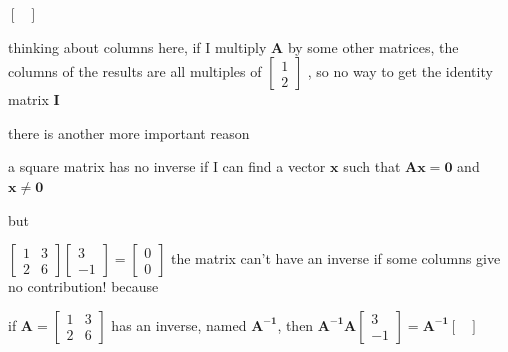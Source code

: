 \documentclass[12pt, a4paper]{article}
\begin{document}
{\begin{math}
\begin{bmatrix}
	\end{bmatrix}
\end{math}
\par thinking about columns here, if I multiply ${\mathbf{A}}$ by some other matrices, the columns of the results are all multiples of 
\begin{math}
	\begin{bmatrix}
		1 \\
		2
	\end{bmatrix}
\end{math}
, so no way to get the identity matrix ${\mathbf{I}}$
\par there is another more important reason
\par a square matrix has no inverse if I can find a vector ${\mathbf{x}}$ such that ${\mathbf{A}}{\mathbf{x}} = {\mathbf{0}}$ and ${\mathbf{x}} \neq {\mathbf{0}}$
\par but 
\par \qquad
\begin{math}
	\begin{bmatrix}
		1 & 3 \\
		2 & 6
	\end{bmatrix}
	\begin{bmatrix}
		3 \\
		-1
	\end{bmatrix}
	 = 
	\begin{bmatrix}
		0 \\
		0
	\end{bmatrix}
\end{math}
\vspace{14pt}
\newline
{\textcolor{anhao-scarlet}{the matrix can't have an inverse if some columns give no contribution!}}
\vspace{14pt}
\newline
because
\par if 
\begin{math}
	{\mathbf{A}} = 
	\begin{bmatrix}
		1 & 3 \\
		2 & 6
	\end{bmatrix}
\end{math}
 has an inverse, named ${\mathbf{A^{-1}}}$, then 
\begin{math}
	{\mathbf{A^{-1}}}{\mathbf{A}}
	\begin{bmatrix}
		3 \\
		-1
	\end{bmatrix}
	 = 
	{\mathbf{A^{-1}}}
	\begin{bmatrix}

\end{bmatrix}
\end{math}}
\end{document}
